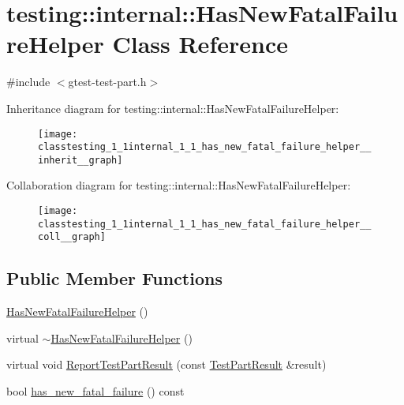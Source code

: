 \hypertarget{classtesting_1_1internal_1_1_has_new_fatal_failure_helper}{}\section{testing\+:\+:internal\+:\+:Has\+New\+Fatal\+Failure\+Helper Class Reference}
\label{classtesting_1_1internal_1_1_has_new_fatal_failure_helper}


{\ttfamily \#include $<$gtest-\/test-\/part.\+h$>$}



Inheritance diagram for testing\+:\+:internal\+:\+:Has\+New\+Fatal\+Failure\+Helper\+:
\nopagebreak
\begin{figure}[H]
\begin{center}
\leavevmode
\texttt{[image: classtesting\_1\_1internal\_1\_1\_has\_new\_fatal\_failure\_helper\_\_inherit\_\_graph]}
\end{center}
\end{figure}


Collaboration diagram for testing\+:\+:internal\+:\+:Has\+New\+Fatal\+Failure\+Helper\+:
\nopagebreak
\begin{figure}[H]
\begin{center}
\leavevmode
\texttt{[image: classtesting\_1\_1internal\_1\_1\_has\_new\_fatal\_failure\_helper\_\_coll\_\_graph]}
\end{center}
\end{figure}
\subsection*{Public Member Functions}
\begin{DoxyCompactItemize}
\item 
\hyperlink{classtesting_1_1internal_1_1_has_new_fatal_failure_helper_a59190a7188db558c00b4c6bf9251859a}{Has\+New\+Fatal\+Failure\+Helper} ()
\item 
virtual \hyperlink{classtesting_1_1internal_1_1_has_new_fatal_failure_helper_a913b1bc7c372868c9b2dbb009044ee97}{$\sim$\+Has\+New\+Fatal\+Failure\+Helper} ()
\item 
virtual void \hyperlink{classtesting_1_1internal_1_1_has_new_fatal_failure_helper_a2d2e1faa1f3669b82810df97ac678a27}{Report\+Test\+Part\+Result} (const \hyperlink{classtesting_1_1_test_part_result}{Test\+Part\+Result} \&result)
\item 
bool \hyperlink{classtesting_1_1internal_1_1_has_new_fatal_failure_helper_ae137e639098071f11f531bbd72dde1c7}{has\+\_\+new\+\_\+fatal\+\_\+failure} () const 
\end{DoxyCompactItemize}


